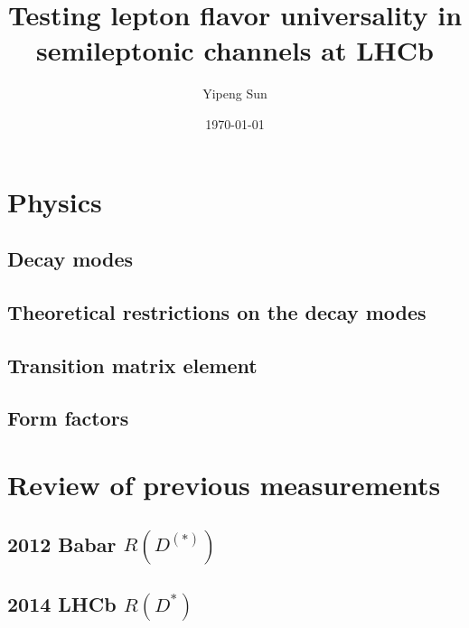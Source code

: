 \documentclass[10pt]{article}
\title{Testing lepton flavor universality in semileptonic channels at LHCb}
\author{Yipeng Sun}
\date{\today}
\begin{document}
\maketitle

\section{Physics}
\subsection{Decay modes}

\subsection{Theoretical restrictions on the decay modes}

\subsection{Transition matrix element}

\subsection{Form factors}

\section{Review of previous measurements}
\subsection{2012 Babar $R(D^{(*)})$}

\subsection{2014 LHCb $R(D^{*})$}
\end{document}
